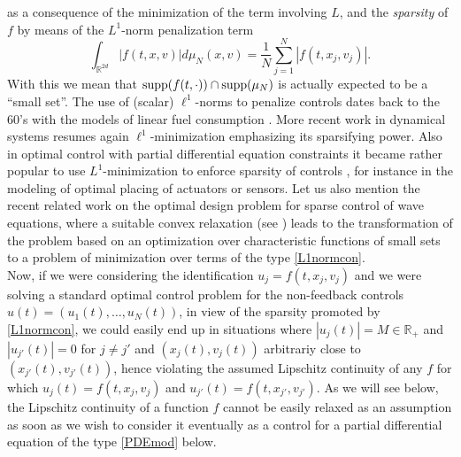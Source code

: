 \documentclass[11pt]{article}
\theoremstyle{plain}
\theoremstyle{definition}
\theoremstyle{remark}
\numberwithin{equation}{section}
\newcommand{\supp}{{\rm supp}}
\begin{document}
as a consequence of the minimization of the term involving $L$, and the {\it sparsity} of $f$ by means of the $L^1$-norm penalization term
\begin{equation}\label{L1normcon}
\int_{\mathbb R^{2d}}| f(t,x,v) |  d \mu_N(x,v) = \frac{1}{N} \sum_{j=1}^N | f(t,x_j,v_j)|.
\end{equation}
With this we mean that $\supp(f(t,\cdot))\cap \supp(\mu_N)$ is actually expected to be a ``small set''. The use of (scalar) $\ell^1$-norms to penalize controls dates back to the 60's with the models of linear fuel consumption \cite{crlo65}. 
More recent work in dynamical systems \cite{voma06} resumes again $\ell^1$-minimization emphasizing its sparsifying power. 
Also in optimal control with partial differential equation constraints it became rather popular to use $L^1$-minimization to enforce sparsity of controls \cite{caclku12,clku11,clku12,hestwa12,pive12,st09,wawa11}, for instance
in the modeling of optimal placing of actuators or sensors. Let us also mention the recent related work \cite{prtrzu13} on the optimal design problem for sparse control of wave equations, where a suitable convex relaxation (see \cite[Remark 1]{prtrzu13}) leads to the 
transformation of the problem based on an optimization over characteristic functions of small sets to a problem of minimization over terms of the type \eqref{L1normcon}.
\\
Now, if we were considering the identification $u_j = f(t,x_j,v_j)$ and we were solving a standard optimal control problem for the non-feedback controls $u(t)=(u_1(t),\dots,u_N(t))$, in view of the sparsity promoted by \eqref{L1normcon}, we could easily end up in situations where $|u_j(t)| =M \in \mathbb R_+$ and $|u_{j'}(t)|=0$ for $j \neq j'$ and $(x_j(t),v_j(t))$ arbitrariy close to $(x_{j'}(t),v_{j'}(t))$,  hence violating the assumed Lipschitz continuity of any $f$ for which $u_j(t)=f(t,x_j,v_j)$ and $u_{j'}(t)=f(t,x_{j'},v_{j'})$. As we will see below, the Lipschitz continuity of a function $f$ cannot be easily relaxed as an assumption as soon as we wish to consider it eventually as a control for a partial differential equation of the type \eqref{PDEmod} below.
\\
\end{document}
